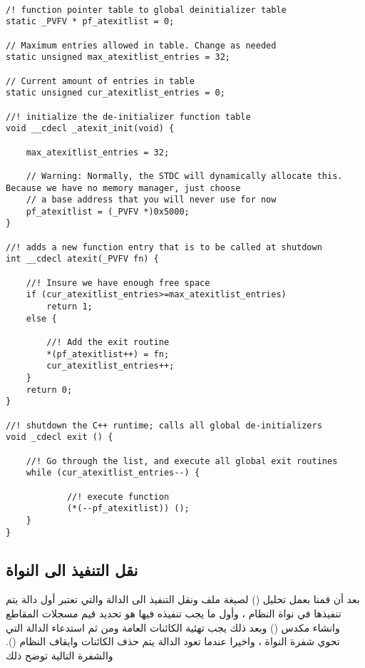 \documentclass[document.tex]{subfiles}
\begin{document}
\begin{english}

\lstset{numberstyle=\tiny,numbers=left,stepnumber=1,numbersep=5pt,tabsize=2,extendedchars=true,breaklines=true,frame=b,showspaces=false, showtabs=false,xleftmargin=10pt,framexleftmargin=10pt,framexrightmargin=5pt,framexbottommargin=4pt,showstringspaces=false,language=C++}

\begin{lstlisting}[label=del_obj,caption=\en{Delete Object}]

/! function pointer table to global deinitializer table
static _PVFV * pf_atexitlist = 0;

// Maximum entries allowed in table. Change as needed
static unsigned max_atexitlist_entries = 32;

// Current amount of entries in table
static unsigned cur_atexitlist_entries = 0;

//! initialize the de-initializer function table
void __cdecl _atexit_init(void) {

    max_atexitlist_entries = 32;

	// Warning: Normally, the STDC will dynamically allocate this. Because we have no memory manager, just choose
	// a base address that you will never use for now
	pf_atexitlist = (_PVFV *)0x5000;
}

//! adds a new function entry that is to be called at shutdown
int __cdecl atexit(_PVFV fn) {

	//! Insure we have enough free space
	if (cur_atexitlist_entries>=max_atexitlist_entries)
		return 1;
	else {

		//! Add the exit routine
		*(pf_atexitlist++) = fn;
		cur_atexitlist_entries++;
	}
	return 0;
}

//! shutdown the C++ runtime; calls all global de-initializers
void _cdecl exit () {

	//! Go through the list, and execute all global exit routines
	while (cur_atexitlist_entries--) {

			//! execute function
			(*(--pf_atexitlist)) ();
	}
}

\end{lstlisting}
\end{english}

\subsection{نقل التنفيذ الى النواة}
بعد أن قمنا بعمل تحليل () لصيغة ملف  ونقل التنفيذ الى الدالة  والتي تعتبر أول دالة يتم تنفيذها في نواة النظام ، وأول ما يجب تنفيذه فيها هو تحديد قيم مسجلات المقاطع وانشاء مكدس () وبعد ذلك يجب تهئية الكائنات العامة ومن ثم استدعاء الدالة  التي تحوي شفرة النواة ، واخيرا عندما تعود الدالة  يتم حذف الكائنات وايقاف النظام (). والشفرة التالية توضح ذلك
\end{document}
